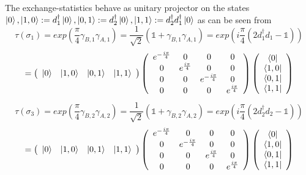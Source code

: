 \documentclass[Master]{subfiles}
\begin{document}
The exchange-statistics behave as unitary projector on the states $ \ket{0}, \ket{1,0} := d_1^{\dag}\ket{0},\ket{0,1} := d_2^{\dag}\ket{0},\ket{1,1} := d_2^{\dag}d_1^{\dag}\ket{0} $$
$ as can be seen from
$$\tau(\sigma_1) = exp \left( \frac{\pi}{4} \gamma_{B,1}\gamma_{A,1}\right) = \frac{1}{\sqrt{2}} (\mathbb{1} + \gamma_{B,1}\gamma_{A,1}) = exp \left( i \frac{\pi}{4} (2d_1^{\dag}d_1 - \mathbb{1})\right) 
$$
$$= 
\left(
\begin{array}{cccc}
     \ket{0} & \ket{1,0} & \ket{0,1} & \ket{1,1}
\end{array}
\right)
\left(
\begin{array}{cccc}
   e^{-\frac{i \pi}{4}}  &  0 & 0 & 0 \\
   0  & e^{\frac{i \pi}{4}}& 0 & 0 \\
    0 & 0 &e^{-\frac{i \pi}{4}}  &  0\\
    0 & 0 &0  & e^{\frac{i \pi}{4}}
\end{array}
\right)
\left(
\begin{array}{c}
     \bra{0}\\
     \bra{1,0}\\
     \bra{0,1}\\
     \bra{1,1}
\end{array}
\right)
$$
$$
\tau(\sigma_3) = exp \left( \frac{\pi}{4} \gamma_{B,2}\gamma_{A,2}\right) = \frac{1}{\sqrt{2}} (\mathbb{1} + \gamma_{B,2}\gamma_{A,2}) = exp \left( i \frac{\pi}{4} (2d_2^{\dag}d_2 - \mathbb{1})\right) 
$$
$$= 
\left(
\begin{array}{cccc}
     \ket{0} & \ket{1,0} & \ket{0,1} & \ket{1,1}
\end{array}
\right)
\left(
\begin{array}{cccc}
   e^{-\frac{i \pi}{4}}  &  0 & 0 & 0 \\
   0  & e^{-\frac{i \pi}{4}}& 0 & 0 \\
    0 & 0 &e^{\frac{i \pi}{4}}  &  0\\
    0 & 0 &0  & e^{\frac{i \pi}{4}}
\end{array}
\right)
\left(
\begin{array}{c}
     \bra{0}\\
     \bra{1,0}\\
     \bra{0,1}\\
     \bra{1,1}
\end{array}
\right)
$$
$$
\end{document}

